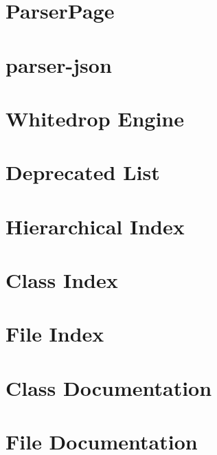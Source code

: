 \documentclass[twoside]{book}
\newcommand{\+}{\discretionary{\mbox{\scriptsize$\hookleftarrow$}}{}{}}
\begin{document}
\chapter{Parser\+Page}
\label{_parser_page}
\hypertarget{_parser_page}{}

\chapter{parser-\/json}
\label{md__c_1__ogre_s_d_k__projects_whitedrop_parser__r_e_a_d_m_e}
\hypertarget{md__c_1__ogre_s_d_k__projects_whitedrop_parser__r_e_a_d_m_e}{}

\chapter{Whitedrop Engine}
\label{md__c_1__ogre_s_d_k__projects_whitedrop__r_e_a_d_m_e}
\hypertarget{md__c_1__ogre_s_d_k__projects_whitedrop__r_e_a_d_m_e}{}

\chapter{Deprecated List}
\label{deprecated}
\hypertarget{deprecated}{}

\chapter{Hierarchical Index}

\chapter{Class Index}

\chapter{File Index}

\chapter{Class Documentation}
















\chapter{File Documentation}







\newpage
{}
{}
\printindex
\end{document}
